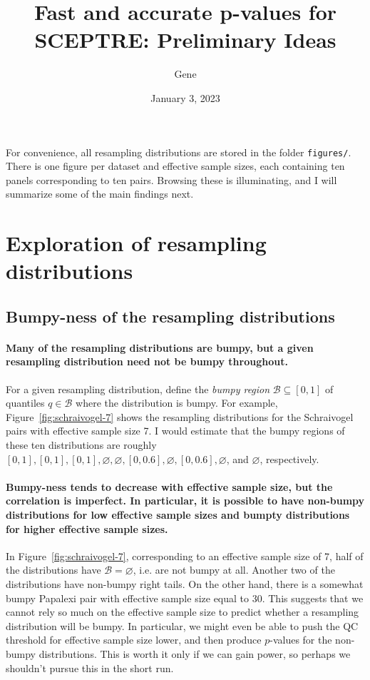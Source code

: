 \documentclass[12pt]{article}
\begin{document}
\title{Fast and accurate p-values for SCEPTRE: Preliminary Ideas}
\author{Gene}
\date{January 3, 2023}

\maketitle
\thispagestyle{empty}

For convenience, all resampling distributions are stored in the folder \verb|figures/|. There is one figure per dataset and effective sample sizes, each containing ten panels corresponding to ten pairs. Browsing these is illuminating, and I will summarize some of the main findings next. 

\section[Exploration]{Exploration of resampling distributions}

\subsection{Bumpy-ness of the resampling distributions}

\paragraph{Many of the resampling distributions are bumpy, but a given resampling distribution need not be bumpy throughout.} For a given resampling distribution, define the \textit{bumpy region} $\mathcal B \subseteq [0,1]$ of quantiles $q \in \mathcal B$ where the distribution is bumpy. For example, Figure~\ref{fig:schraivogel-7}  shows the resampling distributions for the Schraivogel pairs with effective sample size 7. I would estimate that the bumpy regions of these ten distributions are roughly $[0,1], [0,1], [0,1], \varnothing, \varnothing, [0, 0.6], \varnothing, [0, 0.6], \varnothing$, and $\varnothing$, respectively.

\paragraph{Bumpy-ness tends to decrease with effective sample size, but the correlation is imperfect. In particular, it is possible to have non-bumpy distributions for low effective sample sizes and bumpty distributions for higher effective sample sizes.} In Figure~\ref{fig:schraivogel-7}, corresponding to an effective sample size of 7, half of the distributions have $\mathcal B = \varnothing$, i.e. are not bumpy at all. Another two of the distributions have non-bumpy right tails. On the other hand, there is a somewhat bumpy Papalexi pair with effective sample size equal to 30. This suggests that we cannot rely so much on the effective sample size to predict whether a resampling distribution will be bumpy. In particular, we might even be able to push the QC threshold for effective sample size lower, and then produce $p$-values for the non-bumpy distributions. This is worth it only if we can gain power, so perhaps we shouldn't pursue this in the short run.
\end{document}
